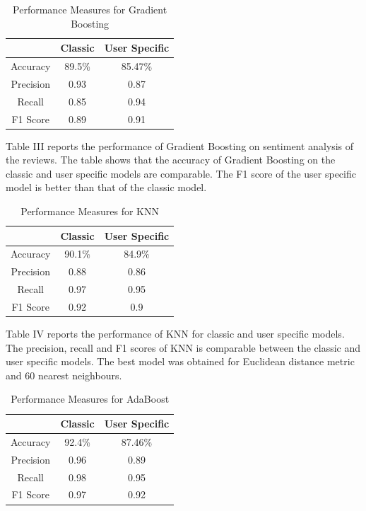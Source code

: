 \documentclass[letterpaper, 10 pt, conference]{ieeeconf}  %
\begin{document}
\begin{table}[H]
\begin{center}
 \caption{Performance Measures for Gradient Boosting}
  \begin{tabular}{ |c|c|c| }
    \hline
    \textbf{}&{\textbf{Classic}} & \textbf{User Specific}\\ \hline
    Accuracy & 89.5\% & 85.47\%\\ \hline
    Precision & 0.93 & 0.87\\ \hline 
    Recall & 0.85 & 0.94\\ \hline 
    F1 Score & 0.89 & 0.91\\ \hline 
    \hline
  \end{tabular}
\end{center}
\end{table}

Table III reports the performance of Gradient Boosting on sentiment analysis of the reviews. The table shows that the accuracy of Gradient Boosting on the classic and user specific models are comparable. The F1 score of the user specific model is better than that of the classic model.

\begin{table}[H]
\begin{center}
 \caption{Performance Measures for KNN }
  \begin{tabular}{ |c|c|c| }
    \hline
    \textbf{}&{\textbf{Classic}} & \textbf{User Specific}\\ \hline
    Accuracy & 90.1\% & 84.9\%\\ \hline
    Precision & 0.88 & 0.86\\ \hline 
    Recall & 0.97 & 0.95\\ \hline 
    F1 Score & 0.92 & 0.9\\ \hline 
    \hline
  \end{tabular}
\end{center}
\end{table}

Table IV reports the performance of KNN for classic and user specific models. The precision, recall and F1 scores of KNN is comparable between the classic and user specific models. The best model was obtained for Euclidean distance metric and 60 nearest neighbours.

\begin{table}[H]
\begin{center}
 \caption{Performance Measures for AdaBoost }
  \begin{tabular}{ |c|c|c| }
    \hline
    \textbf{}&{\textbf{Classic}} & \textbf{User Specific}\\ \hline
    Accuracy & 92.4\% & 87.46\%\\ \hline
    Precision & 0.96 & 0.89\\ \hline 
    Recall & 0.98 & 0.95\\ \hline 
    F1 Score & 0.97 & 0.92\\ \hline 
    \hline
  \end{tabular}
\end{center}
\end{table}
\end{document}

